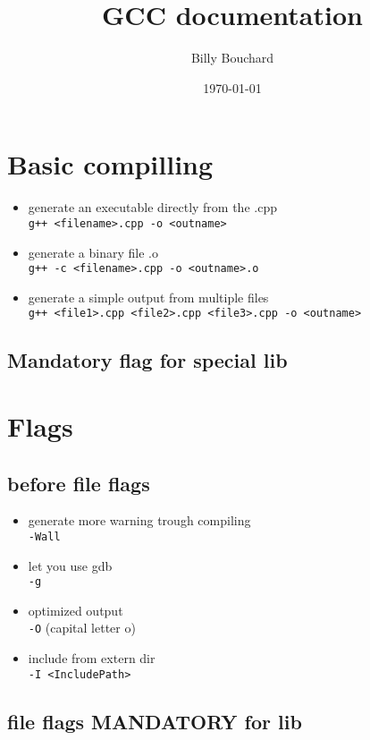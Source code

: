 \documentclass[12pt]{article}
\author{Billy Bouchard}
\title{GCC documentation}
\date{\today}
\begin{document}
\maketitle
\tableofcontents
\newpage
\section{Basic compilling}
\begin{itemize}
	\item generate an executable directly from the .cpp \\ \verb|g++ <filename>.cpp -o <outname>|
	\item generate a binary file .o \\ \verb|g++ -c <filename>.cpp -o <outname>.o|
	\item generate a simple output from multiple files \\ \verb|g++ <file1>.cpp <file2>.cpp <file3>.cpp -o <outname>|
\end{itemize}
\subsection{Mandatory flag for special lib}
\begin{itemize}
\end{itemize}


\newpage
\section{Flags}
\subsection{before file flags}
\begin{itemize}
	\item generate more warning trough compiling \\ \verb|-Wall|
	\item let you use gdb \\ \verb|-g|
	\item optimized output \\ \verb|-O| (capital letter o)
	\item include from extern dir \\ \verb|-I <IncludePath>|
\end{itemize}
\subsection{file flags MANDATORY for lib}
\end{document}
